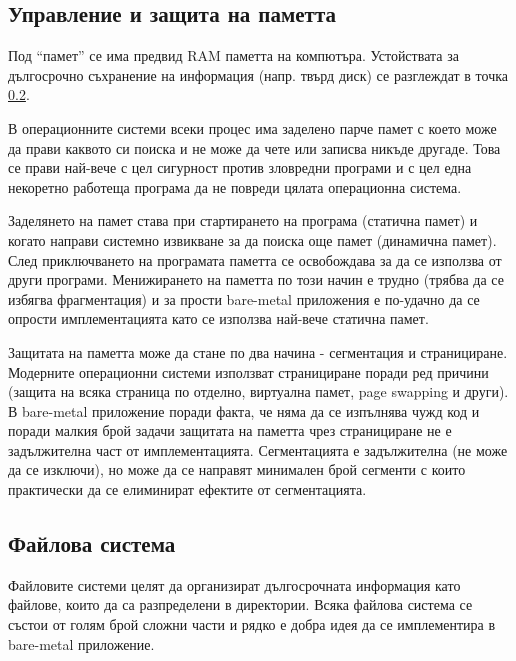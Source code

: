   \subsection{Управление и защита на паметта}
  Под ``памет'' се има предвид RAM паметта на компютъра. Устойствата за дългосрочно съхранение на информация (напр. твърд диск) се разглеждат в точка \ref{filesystems}.

  В операционните системи всеки процес има заделено парче памет с което може да прави каквото си поиска и не може да чете или записва никъде другаде. Това се прави най-вече с цел сигурност против зловредни програми и с цел една некоретно работеща програма да не повреди цялата операционна система.

  Заделянето на памет става при стартирането на програма (статична памет) и когато направи системно извикване за да поиска още памет (динамична памет). След приключването на програмата паметта се освобождава за да се използва от други програми. Менижирането на паметта по този начин е трудно (трябва да се избягва фрагментация) и за прости bare-metal приложения е по-удачно да се опрости имплементацията като се използва най-вече статична памет.

  Защитата на паметта може да стане по два начина - сегментация и странициране. Модерните операционни системи използват странициране поради ред причини (защита на всяка страница по отделно, виртуална памет, page swapping и други).
  В bare-metal приложение поради факта, че няма да се изпълнява чужд код и поради малкия брой задачи защитата на паметта чрез странициране не е задължителна част от имплементацията. Сегментацията е задължителна (не може да се изключи), но може да се направят минимален брой сегменти с които практически да се елиминират ефектите от сегментацията.

  \subsection{Файлова система} \label{filesystems}
  Файловите системи целят да организират дългосрочната информация като файлове, които да са разпределени в директории. Всяка файлова система се състои от голям брой сложни части и рядко е добра идея да се имплементира в bare-metal приложение.

